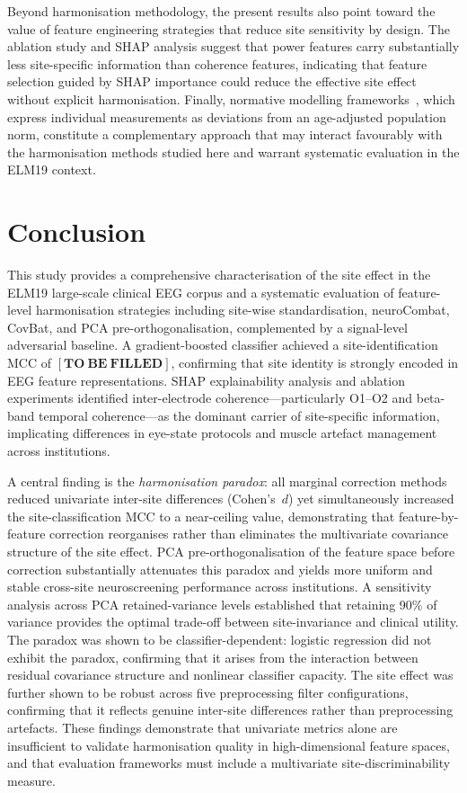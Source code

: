 \documentclass[preprint,12pt]{elsarticle}
\begin{document}
Beyond harmonisation methodology, the present results also point
toward the value of feature engineering strategies that reduce
site sensitivity by design.
The ablation study and SHAP analysis suggest that power features carry
substantially less site-specific information than coherence features,
indicating that feature selection guided by SHAP importance could
reduce the effective site effect without explicit harmonisation.
Finally, normative modelling frameworks~\cite{dong2025normative},
which express individual measurements as deviations from an
age-adjusted population norm, constitute a complementary approach that
may interact favourably with the harmonisation methods studied here
and warrant systematic evaluation in the ELM19 context.

\section{Conclusion}
\label{sec:conclusion}

This study provides a comprehensive characterisation of the site
effect in the ELM19 large-scale clinical EEG corpus and a systematic
evaluation of feature-level harmonisation strategies including
site-wise standardisation, neuroCombat, CovBat, and PCA
pre-orthogonalisation, complemented by a signal-level adversarial
baseline.
A gradient-boosted classifier achieved a site-identification MCC of
$\mathbf{[TO\ BE\ FILLED]}$, confirming that site identity is
strongly encoded in EEG feature representations.
SHAP explainability analysis and ablation experiments identified
inter-electrode coherence---particularly O1--O2 and beta-band
temporal coherence---as the dominant carrier of site-specific
information, implicating differences in eye-state protocols and
muscle artefact management across institutions.

A central finding is the \emph{harmonisation paradox}: all marginal
correction methods reduced univariate inter-site differences
(Cohen's~$d$) yet simultaneously increased the site-classification
MCC to a near-ceiling value, demonstrating that feature-by-feature
correction reorganises rather than eliminates the multivariate
covariance structure of the site effect.
PCA pre-orthogonalisation of the feature space before correction
substantially attenuates this paradox and yields more uniform and
stable cross-site neuroscreening performance across institutions.
A sensitivity analysis across PCA retained-variance levels established
that retaining 90\% of variance provides the optimal trade-off
between site-invariance and clinical utility.
The paradox was shown to be classifier-dependent: logistic regression
did not exhibit the paradox, confirming that it arises from the
interaction between residual covariance structure and nonlinear
classifier capacity.
The site effect was further shown to be robust across five
preprocessing filter configurations, confirming that it reflects
genuine inter-site differences rather than preprocessing artefacts.
These findings demonstrate that univariate metrics alone are
insufficient to validate harmonisation quality in high-dimensional
feature spaces, and that evaluation frameworks must include a
multivariate site-discriminability measure.
\end{document}
